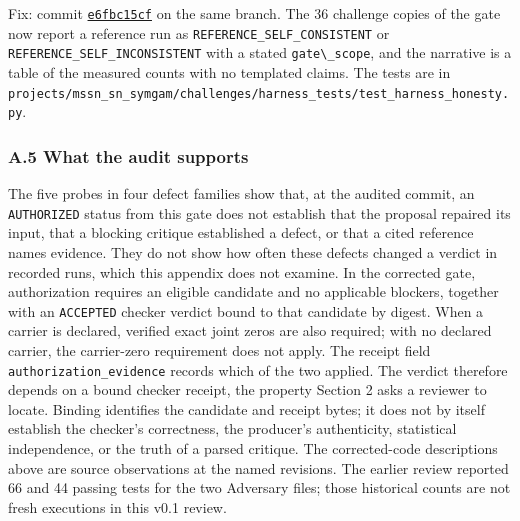 \documentclass[
  11pt,
]{article}
\newcommand{\passthrough}[1]{#1}
\begin{document}
Fix: commit
\href{https://github.com/dbccpage/the_symbol_game/commit/e6fbc15cf011121597a82a1d199626063bedf7c0}{\passthrough{\lstinline!e6fbc15cf!}}
on the same branch. The 36 challenge copies of the gate now report a
reference run as \nolinkurl{REFERENCE_SELF_CONSISTENT} or
\nolinkurl{REFERENCE_SELF_INCONSISTENT} with a stated
\passthrough{\lstinline!gate\_scope!}, and the narrative is a table of
the measured counts with no templated claims. The tests are in
\nolinkurl{projects/mssn_sn_symgam/challenges/harness_tests/test_harness_honesty.py}.

\subsubsection{A.5 What the audit
supports}\label{a.5-what-the-audit-supports}

The five probes in four defect families show that, at the audited
commit, an \passthrough{\lstinline!AUTHORIZED!} status from this gate
does not establish that the proposal repaired its input, that a blocking
critique established a defect, or that a cited reference names evidence.
They do not show how often these defects changed a verdict in recorded
runs, which this appendix does not examine. In the corrected gate,
authorization requires an eligible candidate and no applicable blockers,
together with an \passthrough{\lstinline!ACCEPTED!} checker verdict
bound to that candidate by digest. When a carrier is declared, verified
exact joint zeros are also required; with no declared carrier, the
carrier-zero requirement does not apply. The receipt field
\nolinkurl{authorization_evidence} records which of the two applied. The
verdict therefore depends on a bound checker receipt, the property
Section 2 asks a reviewer to locate. Binding identifies the candidate
and receipt bytes; it does not by itself establish the checker's
correctness, the producer's authenticity, statistical independence, or
the truth of a parsed critique. The corrected-code descriptions above
are source observations at the named revisions. The earlier review
reported 66 and 44 passing tests for the two Adversary files; those
historical counts are not fresh executions in this v0.1 review.
\end{document}

